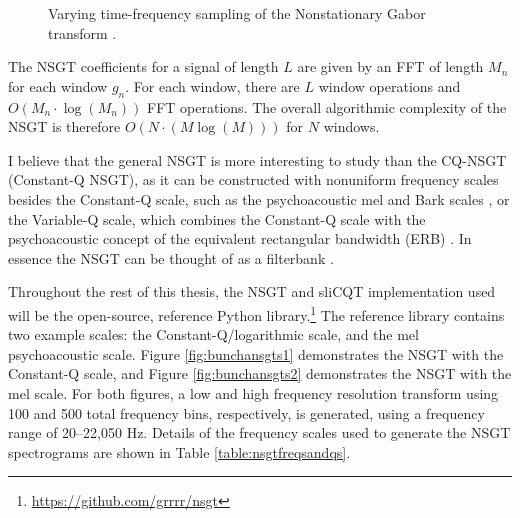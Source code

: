 \documentclass[report.tex]{subfiles}
\begin{document}
\begin{figure}[ht]
	\centering
	\hspace{1em}
	\caption{Varying time-frequency sampling of the Nonstationary Gabor transform \parencite[1485, 1487]{balazs}.}
	\label{fig:nonuniformtflattices}
\end{figure}

The NSGT coefficients for a signal of length $L$ are given by an FFT of length $M_{n}$ for each window $g_{n}$. For each window, there are $L$ window operations and $O(M_{n} \cdot \log(M_{n}))$ FFT operations. The overall algorithmic complexity of the NSGT is therefore $O(N \cdot (M \log(M)))$ for $N$ windows.

I believe that the general NSGT is more interesting to study than the CQ-NSGT (Constant-Q NSGT), as it can be constructed with nonuniform frequency scales besides the Constant-Q scale, such as the psychoacoustic mel and Bark scales \parencite{melbook}, or the Variable-Q scale, which combines the Constant-Q scale with the psychoacoustic concept of the equivalent rectangular bandwidth (ERB) \parencite{variableq1, variableq2}. In essence the NSGT can be thought of as a filterbank \parencite{variableq1}.

Throughout the rest of this thesis, the NSGT and sliCQT implementation used will be the open-source, reference Python library.\footnote{\url{https://github.com/grrrr/nsgt}} The reference library contains two example scales: the Constant-Q/logarithmic scale, and the mel psychoacoustic scale. Figure \ref{fig:bunchansgts1} demonstrates the NSGT with the Constant-Q scale, and Figure \ref{fig:bunchansgts2} demonstrates the NSGT with the mel scale. For both figures, a low and high frequency resolution transform using 100 and 500 total frequency bins, respectively, is generated, using a frequency range of 20--22,050 Hz. Details of the frequency scales used to generate the NSGT spectrograms are shown in Table \ref{table:nsgtfreqsandqs}.
\end{document}
